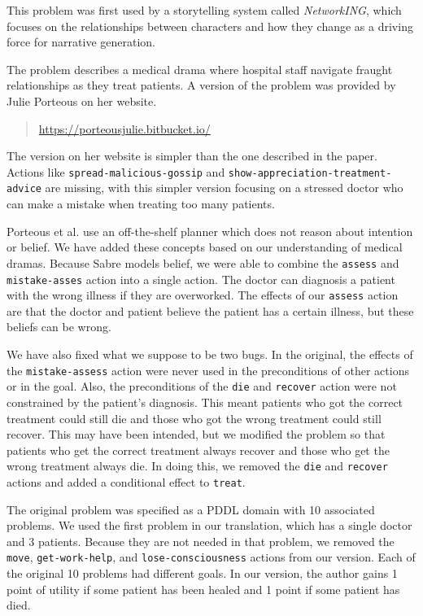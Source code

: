 \documentclass{nilreport}
\makeatletter
\renewcommand{\bibentry}[1]{\nocite{#1}{\frenchspacing\@nameuse{BR@r@#1\@extra@b@citeb}}}
\makeatother
\begin{document}
This problem was first used by a storytelling system called \emph{NetworkING},
which focuses on the relationships between characters and how they
change as a driving force for narrative generation.

\begin{quote}
	\bibentry{porteous2013networking}
\end{quote}

\noindent The problem describes a medical drama where hospital staff
navigate fraught relationships as they treat patients. A version of
the problem was provided by Julie Porteous on her website.

\begin{quote}
	\url{https://porteousjulie.bitbucket.io/}
\end{quote}

\noindent The version on her website is simpler than the one described
in the paper. Actions like \texttt{spread-malicious-gossip} and \texttt{show-appreciation-treatment-advice}
are missing, with this simpler version focusing on a stressed doctor
who can make a mistake when treating too many patients.

Porteous et al. use an off-the-shelf planner which does not reason
about intention or belief. We have added these concepts based on our
understanding of medical dramas. Because Sabre models belief, we were
able to combine the \texttt{assess} and \texttt{mistake-asses} action
into a single action. The doctor can diagnosis a patient with the
wrong illness if they are overworked. The effects of our \texttt{assess}
action are that the doctor and patient believe the patient has a certain
illness, but these beliefs can be wrong.

We have also fixed what we suppose to be two bugs. In the original,
the effects of the \texttt{mistake-assess} action were never used
in the preconditions of other actions or in the goal. Also, the preconditions
of the \texttt{die} and \texttt{recover} action were not constrained
by the patient's diagnosis. This meant patients who got the correct
treatment could still die and those who got the wrong treatment could
still recover. This may have been intended, but we modified the problem
so that patients who get the correct treatment always recover and
those who get the wrong treatment always die. In doing this, we removed
the \texttt{die} and \texttt{recover} actions and added a conditional
effect to \texttt{treat}.

The original problem was specified as a PDDL domain with 10 associated
problems. We used the first problem in our translation, which has
a single doctor and 3 patients. Because they are not needed in that
problem, we removed the \texttt{move}, \texttt{get-work-help}, and
\texttt{lose-consciousness} actions from our version. Each of the
original 10 problems had different goals. In our version, the author
gains 1 point of utility if some patient has been healed and 1 point
if some patient has died.
\end{document}
